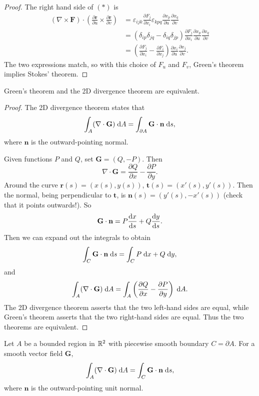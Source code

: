 \documentclass[a4paper]{article}
\begin{document}
\begin{proof}
  The right hand side of $(*)$ is
  \begin{align*}
    (\nabla \times \mathbf{F})\cdot \left(\frac{\partial \mathbf{r}}{\partial u}\times \frac{\partial \mathbf{r}}{\partial v}\right) &= \varepsilon_{ijk}\frac{\partial F_j}{\partial x_i}\varepsilon_{kpq}\frac{\partial x_p}{\partial u}\frac{\partial x_q}{\partial v}\\
    &= (\delta_{ip}\delta_{jq} - \delta_{iq}\delta_{jp}) \frac{\partial F_j}{\partial x_i}\frac{\partial x_p}{\partial u}\frac{\partial x_q}{\partial v}\\
    &= \left(\frac{\partial F_j}{\partial x_i} - \frac{\partial F_i}{\partial x_j}\right)\frac{\partial x_i}{\partial u}\frac{\partial x_j}{\partial v}.
  \end{align*}
  The two expressions match, so with this choice of $F_u$ and $F_v$, Green's theorem implies Stokes' theorem.
\end{proof}

\begin{prop}
  Green's theorem and the 2D divergence theorem are equivalent.
\end{prop}

\begin{proof}
  The 2D divergence theorem states that
  \[
    \int_A (\nabla\cdot \mathbf{G})\;\mathrm{d} A = \int_{\partial A} \mathbf{G}\cdot \mathbf{n}\;\mathrm{d} s,
  \]
  where $\mathbf{n}$ is the outward-pointing normal.

  Given functions $P$ and $Q$, set $\mathbf{G} = (Q, -P)$. Then
  \[
    \nabla\cdot \mathbf{G} = \frac{\partial Q}{\partial x} - \frac{\partial P}{\partial y}.
  \]
  Around the curve $\mathbf{r}(s) = (x(s), y(s))$, $\mathbf{t}(s) = (x'(s), y'(s))$. Then the normal, being perpendicular to $\mathbf{t}$, is $\mathbf{n}(s) = (y'(s), -x'(s))$ (check that it points outwards!). So
  \[
    \mathbf{G}\cdot \mathbf{n} = P\frac{\mathrm{d} x}{\mathrm{d} s} + Q\frac{\mathrm{d} y}{\mathrm{d} s}.
  \]
  Then we can expand out the integrals to obtain
  \[
    \int_C \mathbf{G}\cdot \mathbf{n}\;\mathrm{d} s = \int_C P\;\mathrm{d} x + Q\;\mathrm{d} y,
  \]
  and
  \[
    \int_A(\nabla\cdot \mathbf{G})\;\mathrm{d} A = \int_A\left(\frac{\partial Q}{\partial x} - \frac{\partial P}{\partial y}\right)\;\mathrm{d} A.
  \]
  The 2D divergence theorem asserts that the two left-hand sides are equal, while Green's theorem asserts that the two right-hand sides are equal. Thus the two theorems are equivalent.
\end{proof}

\begin{prop}
  Let $A$ be a bounded region in $\mathbb{R}^2$ with piecewise smooth boundary $C = \partial A$. For a smooth vector field $\mathbf{G}$,
  \[
    \int_A (\nabla\cdot \mathbf{G})\;\mathrm{d} A = \int_C \mathbf{G}\cdot \mathbf{n}\;\mathrm{d} s,
  \]
  where $\mathbf{n}$ is the outward-pointing unit normal.
\end{prop}
\end{document}
